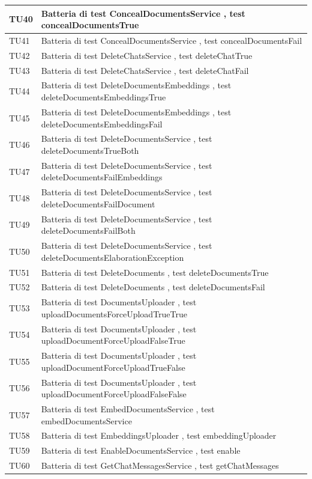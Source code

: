 \documentclass[10pt, a4paper]{article}
\begin{document}
\begin{xltabular}{\textwidth}{p{0.12\textwidth}|X}
\hline
TU40 & Batteria di test ConcealDocumentsService , test concealDocumentsTrue \\
\hline
TU41 & Batteria di test ConcealDocumentsService , test concealDocumentsFail \\
\hline
TU42 & Batteria di test DeleteChatsService , test deleteChatTrue \\
\hline
TU43 & Batteria di test DeleteChatsService , test deleteChatFail \\
\hline
TU44 & Batteria di test DeleteDocumentsEmbeddings , test deleteDocumentsEmbeddingsTrue \\
\hline
TU45 & Batteria di test DeleteDocumentsEmbeddings , test deleteDocumentsEmbeddingsFail \\
\hline
TU46 & Batteria di test DeleteDocumentsService , test deleteDocumentsTrueBoth \\
\hline
TU47 & Batteria di test DeleteDocumentsService , test deleteDocumentsFailEmbeddings \\
\hline
TU48 & Batteria di test DeleteDocumentsService , test deleteDocumentsFailDocument \\
\hline
TU49 & Batteria di test DeleteDocumentsService , test deleteDocumentsFailBoth \\
\hline
TU50 & Batteria di test DeleteDocumentsService , test deleteDocumentsElaborationException \\
\hline
TU51 & Batteria di test DeleteDocuments , test deleteDocumentsTrue \\
\hline
TU52 & Batteria di test DeleteDocuments , test deleteDocumentsFail \\
\hline
TU53 & Batteria di test DocumentsUploader , test uploadDocumentsForceUploadTrueTrue \\
\hline
TU54 & Batteria di test DocumentsUploader , test uploadDocumentForceUploadFalseTrue \\
\hline
TU55 & Batteria di test DocumentsUploader , test uploadDocumentForceUploadTrueFalse \\
\hline
TU56 & Batteria di test DocumentsUploader , test uploadDocumentForceUploadFalseFalse \\
\hline
TU57 & Batteria di test EmbedDocumentsService , test embedDocumentsService \\
\hline
TU58 & Batteria di test EmbeddingsUploader , test embeddingUploader \\
\hline
TU59 & Batteria di test EnableDocumentsService , test enable \\
\hline
TU60 & Batteria di test GetChatMessagesService , test getChatMessages \\

\end{xltabular}
\end{document}
